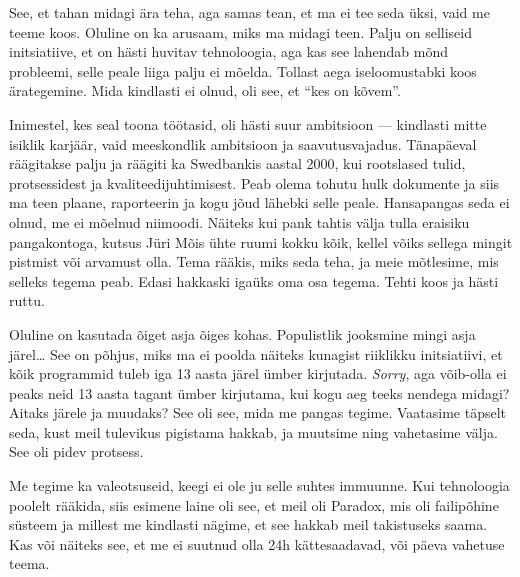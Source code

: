 
See, et tahan midagi ära teha, aga samas tean, et ma ei tee seda üksi, 
vaid me teeme koos. Oluline on ka arusaam, miks ma midagi teen. Palju on selliseid initsiatiive, et on 
hästi huvitav tehnoloogia, aga kas see lahendab mõnd probleemi, selle peale liiga palju ei mõelda. Tollast aega iseloomustabki koos ärategemine. Mida 
kindlasti ei olnud, oli see, et \enquote{kes on kõvem}.

Inimestel, kes seal toona töötasid, oli hästi suur ambitsioon ---
kindlasti mitte isiklik karjäär, vaid meeskondlik ambitsioon ja 
saavutusvajadus. Tänapäeval räägitakse palju ja räägiti ka Swedbankis 
aastal 2000, kui rootslased tulid, protsessidest ja kvaliteedijuhtimisest. Peab 
olema tohutu hulk dokumente ja siis ma teen plaane, raporteerin ja 
kogu jõud lähebki selle peale. Hansapangas seda ei olnud, me ei mõelnud niimoodi. Näiteks kui pank tahtis 
välja tulla eraisiku pangakontoga, kutsus Jüri Mõis 
ühte ruumi kokku kõik, kellel võiks sellega mingit pistmist või 
arvamust olla. Tema rääkis, miks seda teha, ja meie mõtlesime, mis selleks tegema 
peab. Edasi hakkaski igaüks oma osa tegema. Tehti koos ja 
hästi ruttu. 


Oluline on kasutada õiget asja õiges kohas. Populistlik jooksmine 
mingi asja järel\ldots{ }See on põhjus, miks ma ei poolda näiteks kunagist riiklikku initsiatiivi, 
et kõik programmid tuleb iga 13 aasta järel ümber 
kirjutada. \emph{Sorry}, aga võib-olla ei peaks neid 13 aasta tagant ümber 
kirjutama, kui kogu aeg teeks nendega midagi? Aitaks järele ja muudaks? See 
oli see, mida me pangas tegime. Vaatasime täpselt seda, kust meil tulevikus 
pigistama hakkab, ja muutsime ning vahetasime välja. See oli pidev protsess. 


Me tegime ka valeotsuseid, keegi ei ole ju selle suhtes immuunne. 
Kui tehnoloogia poolelt rääkida, siis esimene laine oli see, et meil oli 
Paradox, mis oli failipõhine süsteem ja millest me kindlasti 
nägime, et see hakkab meil takistuseks saama. Kas või näiteks see, et me ei 
suutnud olla 24h kättesaadavad, või päeva vahetuse teema. 

